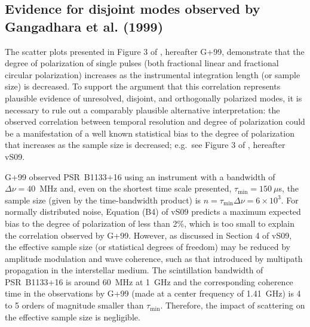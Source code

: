 \documentclass[twocolumn]{aastex6}
\begin{document}
{\begin{appendix}

\setcounter{equation}{48}
\def\theequation{\arabic{equation}}


\section{Evidence for disjoint modes observed by Gangadhara et al. (1999)}
\label{app:gxv+99}

The scatter plots presented in Figure 3 of \citet{gxv+99}, hereafter
G+99, demonstrate that the degree of polarization of single pulses
(both fractional linear and fractional circular polarization)
increases as the instrumental integration length (or sample size) is
decreased.
%
To support the argument that this correlation represents plausible
evidence of unresolved, disjoint, and orthogonally polarized modes, it
is necessary to rule out a comparably plausible alternative
interpretation:
%
the observed correlation between temporal resolution and degree of
polarization could be a manifestation of a well known statistical
bias to the degree of polarization that increases as the sample size
is decreased; e.g.\ see Figure 3 of \citet{van09}, hereafter vS09.


G+99 observed PSR~B1133+16 using an instrument with a
bandwidth of $\Delta\nu=40$~MHz and, even on the shortest time scale
presented, $\tau_\mathrm{min}=150~\mu$s, the sample size (given by
the time-bandwidth product) is
$n=\tau_\mathrm{min}\Delta\nu=6\times10^3$.
%
For normally distributed noise, Equation (B4) of vS09 predicts a
maximum expected bias to the degree of polarization of less than 2\%,
which is too small to explain the correlation observed by G+99.
%
However, as discussed in Section 4 of vS09, the effective sample size
(or statistical degrees of freedom) may be reduced
by amplitude modulation and wave coherence, such as that introduced by
multipath propagation in the interstellar medium.
%
The scintillation bandwidth of PSR~B1133+16 is around 60~MHz at 1~GHz
\citep{cor86} and the corresponding coherence time in the observations
by G+99 (made at a center frequency of 1.41~GHz) is 4 to 5 orders of
magnitude smaller than $\tau_\mathrm{min}$.  Therefore, the impact of
scattering on the effective sample size is negligible.


\end{appendix}}
\end{document}
